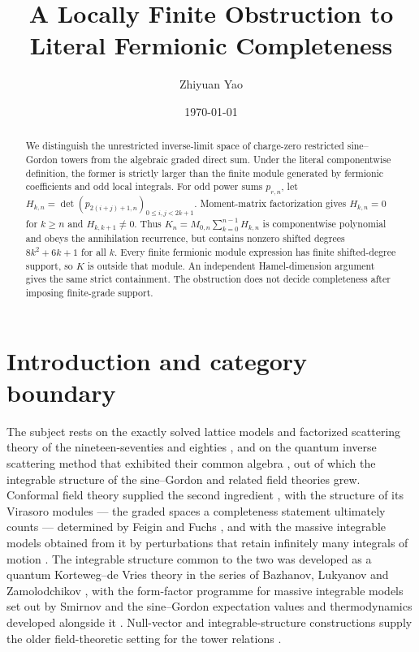 \documentclass[11pt,reqno]{amsart}
\title{A Locally Finite Obstruction to Literal Fermionic Completeness}
\author{Zhiyuan Yao}
\date{\today}
\theoremstyle{plain}
\theoremstyle{definition}
\theoremstyle{remark}
\numberwithin{equation}{section}
\begin{document}
\begin{abstract}
We distinguish the unrestricted inverse-limit space of charge-zero
restricted sine--Gordon towers from the algebraic graded direct sum.  Under
the literal componentwise definition, the former is strictly larger than the
finite module generated by fermionic coefficients and odd local integrals.
For odd power sums $p_{r,n}$, let
$H_{k,n}=\det(p_{2(i+j)+1,n})_{0\le i,j<2k+1}$.  Moment-matrix
factorization gives $H_{k,n}=0$ for $k\ge n$ and
$H_{k,k+1}\ne0$.  Thus
$K_n=M_{0,n}\sum_{k=0}^{n-1}H_{k,n}$ is componentwise polynomial and obeys
the annihilation recurrence, but contains nonzero shifted degrees
$8k^2+6k+1$ for all $k$.  Every finite fermionic module expression has
finite shifted-degree support, so $K$ is outside that module.  An independent
Hamel-dimension argument gives the same strict containment.  The obstruction
does not decide completeness after imposing finite-grade support.
\end{abstract}

\maketitle

\section{Introduction and category boundary}

The subject rests on the exactly solved lattice models and factorized
scattering theory of the nineteen-seventies and eighties
\cite{Baxter_Book,Zamolodchikov_1979fs}, and on the quantum inverse
scattering method that exhibited their common algebra
\cite{Sklyanin_1979qi,Kulish_1981yb}, out of which the integrable
structure of the sine--Gordon and related field theories grew.  Conformal field theory
supplied the second ingredient \cite{Belavin_1984ic}, with the structure of
its Virasoro modules --- the graded spaces a completeness statement
ultimately counts --- determined by Feigin and Fuchs \cite{Feigin_1984vm},
and with the massive integrable models obtained from it by perturbations that
retain infinitely many integrals of motion \cite{Zamolodchikov_1989if}.  The
integrable structure common to the two was developed as a quantum
Korteweg--de Vries theory in the series of Bazhanov, Lukyanov and
Zamolodchikov \cite{Bazhanov_1996is,Bazhanov_1997is,Bazhanov_1999is}, with
the form-factor programme for massive integrable models set out by Smirnov
\cite{Smirnov_Book} and the sine--Gordon expectation values and
thermodynamics developed alongside it
\cite{Lukyanov_1997ff,Lukyanov_1997ee,Destri_1995ua,Zamolodchikov_1990tb,Fateev_1999ev}.  Null-vector and
integrable-structure constructions supply the older field-theoretic setting
for the tower relations \cite{Babelon_1997nv}.
\end{document}
